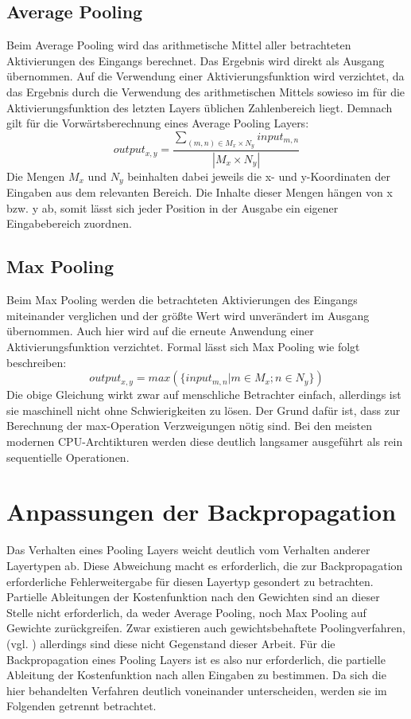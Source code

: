 \documentclass[../main.tex]{subfiles}
\begin{document}
\subsection{Average Pooling}
Beim Average Pooling wird das arithmetische Mittel aller betrachteten Aktivierungen des Eingangs berechnet. Das Ergebnis wird direkt als Ausgang übernommen. Auf die Verwendung einer Aktivierungsfunktion wird verzichtet, da das Ergebnis durch die Verwendung des arithmetischen Mittels sowieso im für die Aktivierungsfunktion des letzten Layers üblichen Zahlenbereich liegt. Demnach gilt für die Vorwärtsberechnung eines Average Pooling Layers: 
\begin{equation} \label{eq:averagepooling}
output_{x, y} = \frac{\sum\limits_{(m, n)\in{M_x}\times{N_y}} input_{m, n}}{|M_x\times{N_y}|}
\end{equation}
Die Mengen \(M_x\) und \(N_y\) beinhalten dabei jeweils die x- und y-Koordinaten der Eingaben aus dem relevanten Bereich. Die Inhalte dieser Mengen hängen von x bzw. y ab, somit lässt sich jeder Position in der Ausgabe ein eigener Eingabebereich zuordnen. 

\subsection{Max Pooling} \label{maxpool_forward}
Beim Max Pooling werden die betrachteten Aktivierungen des Eingangs miteinander verglichen und der größte Wert wird unverändert im Ausgang übernommen. Auch hier wird auf die erneute Anwendung einer Aktivierungsfunktion verzichtet. Formal lässt sich Max Pooling wie folgt beschreiben: 
\begin{equation} \label{eq:maxpooling}
output_{x, y} = max( \{input_{m,n} | m \in M_x; n \in N_y\})
\end{equation}
Die obige Gleichung wirkt zwar auf menschliche Betrachter einfach, allerdings ist sie maschinell nicht ohne Schwierigkeiten zu lösen. Der Grund dafür ist, dass zur Berechnung der max-Operation Verzweigungen nötig sind. Bei den meisten modernen CPU-Archtikturen werden diese deutlich langsamer ausgeführt als rein sequentielle Operationen. 

\section{Anpassungen der Backpropagation}
Das Verhalten eines Pooling Layers weicht deutlich vom Verhalten anderer Layertypen ab. Diese Abweichung macht es erforderlich, die zur Backpropagation erforderliche Fehlerweitergabe für diesen Layertyp gesondert zu betrachten. Partielle Ableitungen der Kostenfunktion nach den Gewichten sind an dieser Stelle nicht erforderlich, da weder Average Pooling, noch Max Pooling auf Gewichte zurückgreifen. Zwar existieren auch gewichtsbehaftete Poolingverfahren, (vgl. \cite{paperMixedPooling}) allerdings sind diese nicht Gegenstand dieser Arbeit. Für die Backpropagation eines Pooling Layers ist es also nur erforderlich, die partielle Ableitung der Kostenfunktion nach allen Eingaben zu bestimmen. Da sich die hier behandelten Verfahren deutlich voneinander unterscheiden, werden sie im Folgenden getrennt betrachtet. 
\end{document}
